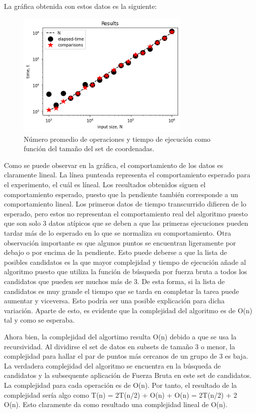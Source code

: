 La gráfica obtenida con estos datos es la siguiente:

\begin{figure}[H]
	\centering
	\includegraphics[keepaspectratio, width = 0.75\textwidth]{Graphic.png}
	\caption{
	  Número promedio de operaciones y tiempo de ejecución como función del tamaño del set de coordenadas.  
	}
	\label{fig:best}
\end{figure}
Como se puede observar en la gráfica, el comportamiento de los datos es claramente lineal. La línea punteada representa el comportamiento esperado para el experimento, el cuál es líneal. Los resultados obtenidos siguen el comportamiento esperado, puesto que la pendiente también corresponde a un comportamiento lineal. Los primeros datos de tiempo transcurrido difieren de lo esperado, pero estos no representan el comportamiento real del algoritmo puesto que son solo 3 datos atípicos que se deben a que las primeras ejecuciones pueden tardar más de lo esperado en lo que se normaliza su comportamiento. Otra observación importante es que algunos puntos se encuentran ligeramente por debajo o por encima de la pendiente. Esto puede deberse a que la lista de posibles candidatos es la que mayor complejidad y tiempo de ejecución añade al algoritmo puesto que utiliza la función de búsqueda por fuerza bruta a todos los candidatos que pueden ser muchos más de 3. De esta forma, si la lista de candidatos es muy grande el tiempo que se tarda en completar la tarea puede aumentar y viceversa. Esto podría ser una posible explicación para dicha variación. Aparte de esto, es evidente que la complejidad del algoritmo es de O(n) tal y como se esperaba. 

Ahora bien, la complejidad del algortimo resulta O(n) debido a que se usa la recursividad. Al dividirse el set de datos en subsets de tamaño 3 o menor, la complejidad para hallar el par de puntos más cercanos de un grupo de 3 es baja. La verdadera complejidad del algoritmo se encuentra en la búsqueda de candidatos y la subsequente aplicación de Fuerza Bruta en este set de candidatos. La complejidad para cada operación es de O(n). Por tanto, el resultado de la complejidad sería algo como T(n) = 2T(n/2) + O(n) + O(n) = 2T(n/2) + 2 O(n). Esto claramente da como resultado una complejidad lineal de O(n).



